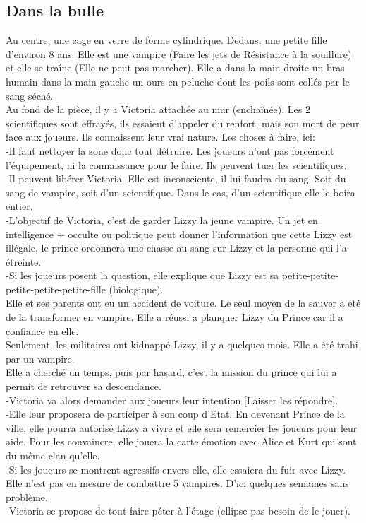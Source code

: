 \documentclass[oneside,12pt]{book}
\begin{document}
\begin{flushleft}
\section{Dans la bulle}
Au centre, une cage en verre de forme cylindrique. Dedans, une petite fille d'environ 8 ans.
Elle est une vampire (Faire les jets de Résistance à la souillure) et elle se traîne (Elle ne peut pas marcher). Elle a dans la main droite un bras humain dans la main gauche un ours en peluche dont les poils sont collés par le sang séché.\\
\vspace{0.5cm}
Au fond de la pièce, il y a Victoria attachée au mur (enchaînée). Les 2 scientifiques sont effrayés, ils essaient d'appeler du renfort, mais son mort de peur face aux joueurs. Ils connaissent leur vrai nature.
\vspace{0.5cm}
Les choses à faire, ici:\\
-Il faut nettoyer la zone donc tout détruire. Les joueurs n'ont pas forcément l'équipement, ni la connaissance pour le faire. Ils peuvent tuer les scientifiques.\\
-Il peuvent libérer Victoria. Elle est inconsciente, il lui faudra du sang. Soit du sang de vampire, soit d'un scientifique. Dans le cas, d'un scientifique elle le boira entier.\\
-L'objectif de Victoria, c'est de garder Lizzy la jeune vampire.
Un jet en intelligence + occulte ou politique peut donner l'information que cette Lizzy est illégale, le prince ordonnera une chasse au sang sur Lizzy et la personne qui l'a étreinte.\\
-Si les joueurs posent la question, elle explique que Lizzy est sa petite-petite-petite-petite-petite-fille (biologique). \\
Elle et ses parents ont eu un accident de voiture. Le seul moyen de la sauver a été de la transformer en vampire. Elle a réussi a planquer Lizzy du Prince car il a confiance en elle. \\
\vspace{0.5cm}
Seulement, les militaires ont kidnappé Lizzy, il y a quelques mois. Elle a été trahi par un vampire. \\
\vspace{0.5cm}
Elle a cherché un temps, puis par hasard, c'est la mission du prince qui lui a permit de retrouver sa descendance.\\
\vspace{0.5cm}
-Victoria va alors demander aux joueurs leur intention [Laisser les répondre].\\
-Elle leur proposera de participer à son coup d'Etat. En devenant Prince de la ville, elle pourra autorisé Lizzy a vivre et elle sera remercier les joueurs pour leur aide. Pour les convaincre, elle jouera la carte émotion avec Alice et Kurt qui sont du même clan qu'elle.\\
-Si les joueurs se montrent agressifs envers elle, elle essaiera du fuir avec Lizzy. Elle n'est pas en mesure de combattre 5 vampires. D'ici quelques semaines sans problème.\\
-Victoria se propose de tout faire péter à l'étage (ellipse pas besoin de le jouer).


\end{flushleft}
\end{document}
